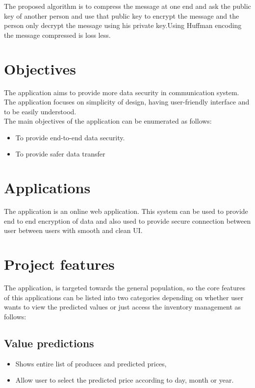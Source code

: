 The proposed algorithm is to compress the message at one end and ask the public key of another person and use that public key to encrypt the message and the person only decrypt the message using his private key.Using Huffman encoding the message compressed is loss less.


\section{Objectives}
The application aims to provide more  data security in communication system. The application focuses on 
simplicity of design, having user-friendly interface and to be easily understood. \\
The main objectives of the application can be enumerated as follows:
\vspace{-18pt}
\begin{itemize}
	\item To provide end-to-end data security.
	\item To provide safer data transfer
\end{itemize}

\section{Applications}
The application is an online web application. This system can be used to provide end to end encryption of data and also used to provide secure connection between user between users with smooth and clean UI. 
 \section{Project features}
 The application, is targeted towards the general population, so the core features of this applications can be listed into two categories depending on whether user wants to view 
 the predicted values or just access the inventory management as follows: 

 \subsection{Value predictions}
 \vspace{-18pt}
 \begin{itemize}
	\item Shows entire list of produces and predicted prices, 
	\item Allow user to select the predicted price according to day, month or year.
\end{itemize}


